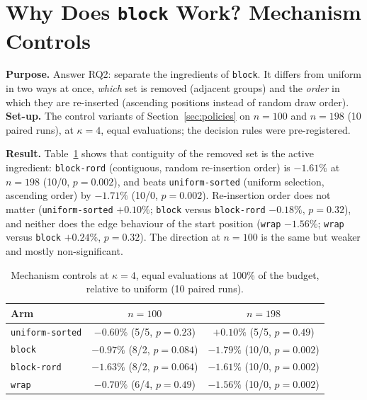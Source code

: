 
\section{Why Does \texttt{block} Work? Mechanism Controls}\label{sec:exp-mech}

\textbf{Purpose.} Answer RQ2: separate the ingredients of \texttt{block}. It differs from uniform in two ways at once, \emph{which} set is removed (adjacent groups) and the \emph{order} in which they are re-inserted (ascending positions instead of random draw order). \textbf{Set-up.} The control variants of Section~\ref{sec:policies} on $n=100$ and $n=198$ (10 paired runs), at $\kappa=4$, equal evaluations; the decision rules were pre-registered.

\textbf{Result.} Table~\ref{tab:mech} shows that contiguity of the removed set is the active ingredient: \texttt{block-rord} (contiguous, random re-insertion order) is $-1.61\%$ at $n=198$ (10/0, $p=0.002$), and beats \texttt{uniform-sorted} (uniform selection, ascending order) by $-1.71\%$ (10/0, $p=0.002$). Re-insertion order does not matter (\texttt{uniform-sorted} $+0.10\%$; \texttt{block} versus \texttt{block-rord} $-0.18\%$, $p=0.32$), and neither does the edge behaviour of the start position (\texttt{wrap} $-1.56\%$; \texttt{wrap} versus \texttt{block} $+0.24\%$, $p=0.32$). The direction at $n=100$ is the same but weaker and mostly non-significant.

\begin{table}[htbp]
\centering
\caption{Mechanism controls at $\kappa=4$, equal evaluations at 100\% of the budget, relative to uniform (10 paired runs).}
\label{tab:mech}
\small
\begin{tabular}{lcc}
\toprule
\textbf{Arm} & $n=100$ & $n=198$\\
\midrule
\texttt{uniform-sorted} & $-0.60\%$ (5/5, $p=0.23$) & $+0.10\%$ (5/5, $p=0.49$)\\
\texttt{block} & $-0.97\%$ (8/2, $p=0.084$) & $-1.79\%$ (10/0, $p=0.002$)\\
\texttt{block-rord} & $-1.63\%$ (8/2, $p=0.064$) & $-1.61\%$ (10/0, $p=0.002$)\\
\texttt{wrap} & $-0.70\%$ (6/4, $p=0.49$) & $-1.56\%$ (10/0, $p=0.002$)\\
\bottomrule
\end{tabular}
\end{table}

